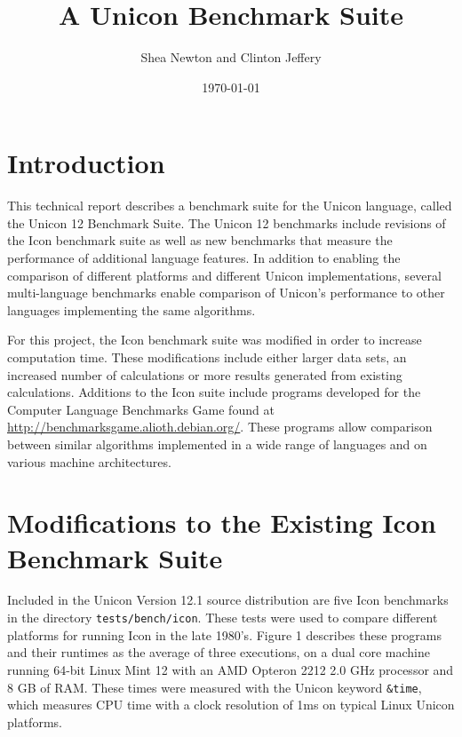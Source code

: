 \documentclass[letterpaper,12pt]{article}
\title{A Unicon Benchmark Suite}
\author{Shea Newton and Clinton Jeffery}
\date{\today}
\begin{document}


\maketitle


\section{Introduction}

This technical report describes a benchmark suite for the Unicon
language, called the Unicon 12 Benchmark Suite. The Unicon 12
benchmarks include revisions of the Icon benchmark suite as well as
new benchmarks that measure the performance of additional language
features. In addition to enabling the comparison of different
platforms and different Unicon implementations, several multi-language
benchmarks enable comparison of Unicon's performance to other
languages implementing the same algorithms.

For this project, the Icon benchmark suite was modified in order to
increase computation time. These modifications include either larger
data sets, an increased number of calculations or more results
generated from existing calculations. Additions to the Icon suite
include programs developed for the Computer Language Benchmarks Game
found at \url{http://benchmarksgame.alioth.debian.org/}. These
programs allow comparison between similar algorithms implemented in a
wide range of languages and on various machine architectures.


\section{Modifications to the Existing Icon Benchmark Suite}

Included in the Unicon Version 12.1 source distribution are five Icon
benchmarks in the directory {\tt tests/bench/icon}. These tests were
used to compare different platforms for running Icon in the late
1980's.  Figure 1 describes these programs and their runtimes as the
average of three executions, on a dual core machine running 64-bit
Linux Mint 12 with an AMD Opteron 2212 2.0 GHz processor and 8 GB of
RAM. These times were measured with the Unicon keyword {\tt \&time},
which measures CPU time with a clock resolution of 1ms on typical
Linux Unicon platforms.
\end{document}
